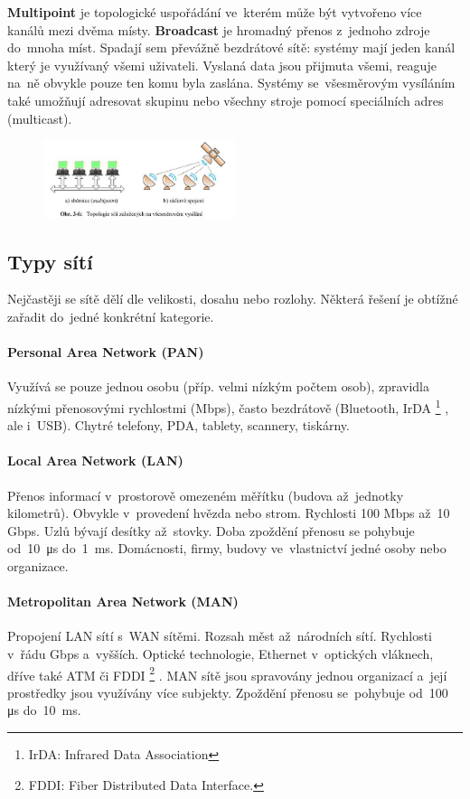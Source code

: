 \textbf{Multipoint} je topologické uspořádání ve~kterém může být vytvořeno více kanálů mezi dvěma místy. \textbf{Broadcast} je hromadný přenos z~jednoho zdroje do~mnoha míst. Spadají sem převážně bezdrátové sítě: systémy mají jeden kanál který je využívaný všemi uživateli. Vyslaná data jsou přijmuta všemi, reaguje na~ně obvykle pouze ten komu byla zaslána. Systémy se~všesměrovým vysíláním také umožňují adresovat skupinu nebo všechny stroje pomocí speciálních adres (multicast).

\begin{figure}[ht]
	\centering
	\includegraphics[width=0.5\textwidth]{images/q01_multipoint_topology}
\end{figure}

\subsection{Typy sítí}

Nejčastěji se sítě dělí dle velikosti, dosahu nebo rozlohy. Některá řešení je obtížné zařadit do~jedné konkrétní kategorie.

\paragraph{Personal Area Network (PAN)} Využívá se pouze jednou osobu (příp. velmi nízkým počtem osob), zpravidla nízkými přenosovými rychlostmi (Mbps), často bezdrátově (Bluetooth, IrDA%
\footnote{IrDA: Infrared Data Association}%
, ale i~USB). Chytré telefony, PDA, tablety, scannery, tiskárny.

\paragraph{Local Area Network (LAN)} Přenos informací v~prostorově omezeném měřítku (budova až~jednotky kilometrů). Obvykle v~provedení hvězda nebo strom. Rychlosti 100 Mbps až~10 Gbps. Uzlů bývají desítky až~stovky. Doba zpoždění přenosu se pohybuje od~10~\si{\micro s} do~1~ms. Domácnosti, firmy, budovy ve~vlastnictví jedné osoby nebo organizace.

\paragraph{Metropolitan Area Network (MAN)} Propojení LAN sítí s~WAN sítěmi. Rozsah měst až~národních sítí. Rychlosti v~řádu Gbps a~vyšších. Optické technologie, Ethernet v~optických vláknech, dříve také ATM či FDDI%
\footnote{FDDI: Fiber Distributed Data Interface.}%
. MAN sítě jsou spravovány jednou organizací a~její prostředky jsou využívány více subjekty. Zpoždění přenosu se~pohybuje od~100 \si{\micro s} do~10~ms.

